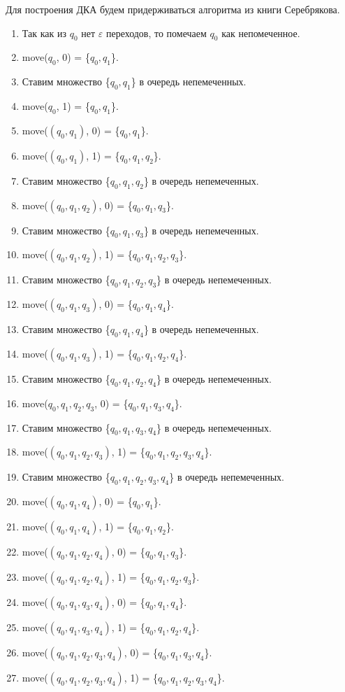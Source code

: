 \documentclass[12pt]{article}
\theoremstyle{definiton}
\theoremstyle{definition}
\theoremstyle{definition}
\let\epsilon\varepsilon
\begin{document}
	Для построения ДКА будем придерживаться алгоритма из книги Серебрякова.
	\begin{enumerate}
		\item Так как из $q_0$ нет $\epsilon$ переходов, то помечаем $q_0$ как непомеченное.
		\item move($q_0$, 0) = \{$q_0, q_1$\}.
		\item Ставим множество \{$q_0, q_1$\} в очередь непемеченных.
		\item move($q_0$, 1) = \{$q_0, q_1$\}.
		\item move($(q_0, q_1)$, 0) = \{$q_0, q_1$\}.
		\item move($(q_0, q_1)$, 1) = \{$q_0, q_1, q_2$\}.
		\item Ставим множество \{$q_0, q_1, q_2$\} в очередь непемеченных.
		\item move($(q_0, q_1, q_2)$, 0) = \{$q_0, q_1, q_3$\}.
		\item Ставим множество \{$q_0, q_1, q_3$\} в очередь непемеченных.
		\item move($(q_0, q_1, q_2)$, 1) = \{$q_0, q_1, q_2, q_3$\}.
		\item Ставим множество \{$q_0, q_1, q_2, q_3$\} в очередь непемеченных.
		\item move($(q_0, q_1, q_3)$, 0) = \{$q_0, q_1, q_4$\}.
		\item Ставим множество \{$q_0, q_1, q_4$\} в очередь непемеченных.
		\item move($(q_0, q_1, q_3)$, 1) = \{$q_0, q_1, q_2, q_4$\}.
		\item Ставим множество \{$q_0, q_1, q_2, q_4$\} в очередь непемеченных.
		\item move($q_0, q_1, q_2, q_3$, 0) = \{$q_0, q_1, q_3, q_4$\}.
		\item Ставим множество \{$q_0, q_1, q_3, q_4$\} в очередь непемеченных.
		\item move($(q_0, q_1, q_2, q_3)$, 1) = \{$q_0, q_1, q_2, q_3, q_4$\}.
		\item Ставим множество \{$q_0, q_1, q_2, q_3, q_4$\} в очередь непемеченных.
		\item move($(q_0, q_1, q_4)$, 0) = \{$q_0, q_1$\}.
		\item move($(q_0, q_1, q_4)$, 1) = \{$q_0, q_1, q_2$\}.
		\item move($(q_0, q_1, q_2, q_4)$, 0) = \{$q_0, q_1, q_3$\}.
		\item move($(q_0, q_1, q_2, q_4)$, 1) = \{$q_0, q_1, q_2, q_3$\}.
		\item move($(q_0, q_1, q_3, q_4)$, 0) = \{$q_0, q_1, q_4$\}.
		\item move($(q_0, q_1, q_3, q_4)$, 1) = \{$q_0, q_1, q_2, q_4$\}.
		\item move($(q_0, q_1, q_2, q_3, q_4)$, 0) = \{$q_0, q_1, q_3, q_4$\}.
		\item move($(q_0, q_1, q_2, q_3, q_4)$, 1) = \{$q_0, q_1, q_2, q_3, q_4$\}.
	\end{enumerate}
	
\end{document}
